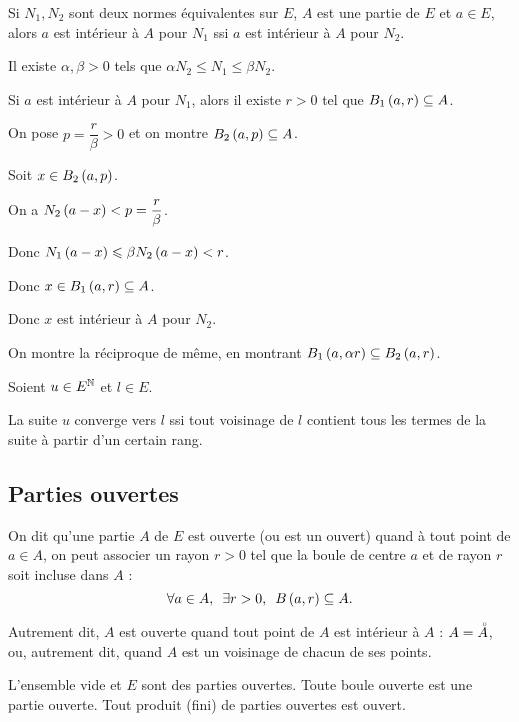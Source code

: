 \begin{dem}
Si \(N_1,N_2\) sont deux normes équivalentes sur \(E\), \(A\) est une partie de \(E\) et \(a\in E\), alors \(a\) est intérieur à \(A\) pour \(N_1\) ssi \(a\) est intérieur à \(A\) pour \(N_2\).

Il existe \(\alpha,\beta>0\) tels que \(\alpha N_2\leq N_1\leq\beta N_2\).

Si \(a\) est intérieur à \(A\) pour \(N_1\), alors il existe \(r>0\) tel que \(\bouleo[1]{a}{r}\subset A\).

On pose \(p=\dfrac{r}{\beta}>0\) et on montre \(\bouleo[2]{a}{p}\subset A\).

Soit \(x\in\bouleo[2]{a}{p}\).

On a \(N_2\left(a-x\right)<p=\dfrac{r}{\beta}\).

Donc \(N_1\left(a-x\right)\leqslant\beta N_2\left(a-x\right)<r\).

Donc \(x\in\bouleo[1]{a}{r}\subset A\).

Donc \(x\) est intérieur à \(A\) pour \(N_2\).

On montre la réciproque de même, en montrant \(\bouleo[1]{a}{\alpha r}\subset\bouleo[2]{a}{r}\).
\end{dem}

\begin{prop}
Soient \(u\in E^{\mathbb{N}}\) et \(l\in E\).

La suite \(u\) converge vers \(l\) ssi tout voisinage de \(l\) contient tous les termes de la suite à partir d'un certain rang.
\end{prop}

\subsection{Parties ouvertes}

\begin{defi}
On dit qu'une partie \(A\) de \(E\) est ouverte (ou est un ouvert) quand à tout point de \(a\in A\), on peut associer un rayon \(r>0\) tel que la boule de centre \(a\) et de rayon \(r\) soit incluse dans \(A\) : \[\quantifs{\forall a\in A;\exists r>0}\bouleo{a}{r}\subset A.\]

Autrement dit, \(A\) est ouverte quand tout point de \(A\) est intérieur à \(A\) : \(A=\accentset{\circ}{A}\), ou, autrement dit, quand \(A\) est un voisinage de chacun de ses points.
\end{defi}

\begin{prop}
L'ensemble vide et \(E\) sont des parties ouvertes. Toute boule ouverte est une partie ouverte. Tout produit (fini) de parties ouvertes est ouvert.
\end{prop}

